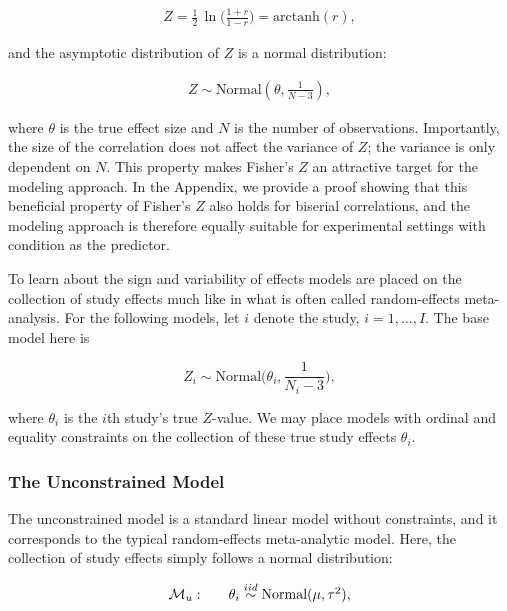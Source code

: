 \documentclass[english,,man]{apa6}
\begin{document}
\begin{align}\label{eq:Zcalc}
Z = \frac{1}{2} \, \ln\Big(\frac{1 + r}{1 - r}\Big) = \mbox{arctanh}(r),
\end{align}

and the asymptotic distribution of \(Z\) is a normal distribution:

\begin{align}\label{eq:fishersZ}
Z \sim \mbox{Normal}(\theta, \frac{1}{N - 3}),
\end{align}

where \(\theta\) is the true effect size and \(N\) is the number of observations. Importantly, the size of the correlation does not affect the variance of \(Z\); the variance is only dependent on \(N\). This property makes Fisher's \(Z\) an attractive target for the modeling approach. In the Appendix, we provide a proof showing that this beneficial property of Fisher's \(Z\) also holds for biserial correlations, and the modeling approach is therefore equally suitable for experimental settings with condition as the predictor.

To learn about the sign and variability of effects models are placed on the collection of study effects much like in what is often called random-effects meta-analysis. For the following models, let \(i\) denote the study, \(i = 1, \ldots, I\). The base model here is

\begin{equation}\label{eq:basemodel}
Z_i \sim \mbox{Normal}\Big(\theta_i, \frac{1}{N_i - 3}\Big),
\end{equation}

where \(\theta_i\) is the \(i\)th study's true \(Z\)-value. We may place models with ordinal and equality constraints on the collection of these true study effects \(\theta_i\).

\hypertarget{the-unconstrained-model}{%
\subsubsection{The Unconstrained Model}\label{the-unconstrained-model}}

The unconstrained model is a standard linear model without constraints, and it corresponds to the typical random-effects meta-analytic model. Here, the collection of study effects simply follows a normal distribution:

\[
\begin{array}{llr}
{\cal M}_u: && \theta_i \stackrel{iid}{\sim} \mbox{Normal}(\mu,\tau^2),\\
\end{array}
\]
\end{document}
